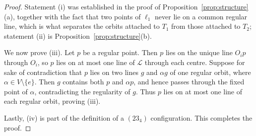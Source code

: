 \documentclass[11pt]{article}
\theoremstyle{plain}
\theoremstyle{definition}
\newcommand{\cL}{\mathcal{L}}
\begin{document}
\begin{proof}
Statement (i) was established in the proof of Proposition~\ref{prop:structure}(a), together with the fact that two points of $\ell_1$ never lie on a common regular line, which is what separates the orbits attached to $T_1$ from those attached to $T_2$; statement (ii) is Proposition~\ref{prop:structure}(b).

We now prove (iii).  Let $p$ be a regular point.  Then $p$ lies on the unique line $O_ip$ through $O_i$, so $p$ lies on at most one line of $\cL$ through each centre.  Suppose for sake of contradiction that $p$ lies on two lines $g$ and $\alpha g$ of one regular orbit, where $\alpha\in V\setminus\{e\}$.  Then $g$ contains both $p$ and $\alpha p$, and hence passes through the fixed point of $\alpha$, contradicting the regularity of $g$.  Thus $p$ lies on at most one line of each regular orbit, proving (iii).

Lastly, (iv) is part of the definition of a $(23_4)$ configuration.  This completes the proof.
\end{proof}
\end{document}
